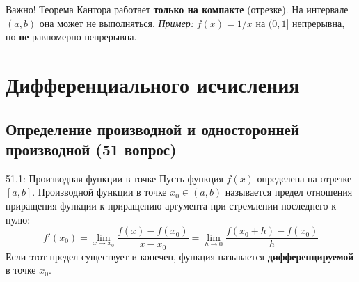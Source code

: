 \documentclass[a4paper,12pt]{article}
\begin{document}
	
	\vspace{0.5cm}
	\begin{importantbox}{Важно!}
		Теорема Кантора работает \textbf{только на компакте} (отрезке). На интервале $(a, b)$ она может не выполняться. 
		\textit{Пример:} $f(x) = 1/x$ на $(0, 1]$ непрерывна, но \textbf{не} равномерно непрерывна.
	\end{importantbox}
	
	
	
	
	
	
	
		
	\newpage
	\section{Дифференциального исчисления}	
	\subsection{Определение производной и односторонней производной (51 вопрос)}

	
	\begin{definitionbox}{51.1: Производная функции в точке}
		Пусть функция $f(x)$ определена на отрезке $[a, b]$. Производной функции в точке $x_0 \in (a, b)$ называется предел отношения приращения функции к приращению аргумента при стремлении последнего к нулю:
		$$ f'(x_0) = \lim_{x \to x_0} \frac{f(x) - f(x_0)}{x - x_0} = \lim_{h \to 0} \frac{f(x_0 + h) - f(x_0)}{h} $$
		Если этот предел существует и конечен, функция называется \textbf{дифференцируемой} в точке $x_0$.
	\end{definitionbox}
	
	\begin{center}
	\end{center}
	
\end{document}
